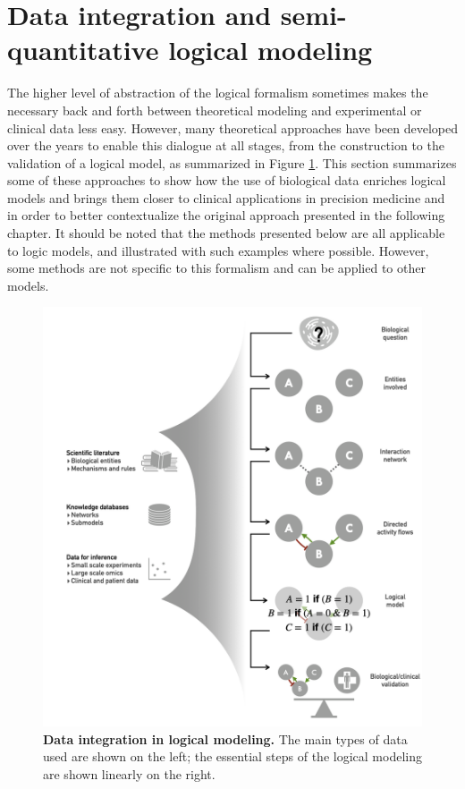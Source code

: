 \documentclass[a4paper,12pt,twoside,onecolumn,openright,final,oldfontcommands]{memoir}
\begin{document}
\section{Data integration and semi-quantitative logical
modeling}\label{logical-data-ssection}

The higher level of abstraction of the logical formalism sometimes makes
the necessary back and forth between theoretical modeling and
experimental or clinical data less easy. However, many theoretical
approaches have been developed over the years to enable this dialogue at
all stages, from the construction to the validation of a logical model,
as summarized in Figure \ref{fig:logical-data}. This section summarizes
some of these approaches to show how the use of biological data enriches
logical models and brings them closer to clinical applications in
precision medicine and in order to better contextualize the original
approach presented in the following chapter. It should be noted that the
methods presented below are all applicable to logic models, and
illustrated with such examples where possible. However, some methods are
not specific to this formalism and can be applied to other models.

\begin{figure}

{\centering \includegraphics[width=0.9\linewidth]{fig/logical-data} 

}

\caption[Main principles of MaBoSS simulation framework and Gillespie algorithm]{\textbf{Data integration in logical
modeling.} The main types of data used are shown on the left; the
essential steps of the logical modeling are shown linearly on the right.}\label{fig:logical-data}
\end{figure}
\end{document}
